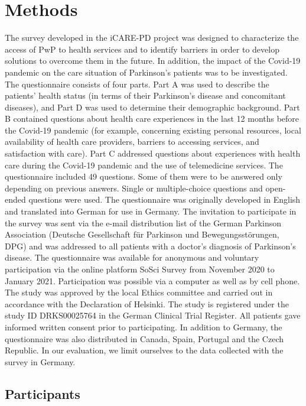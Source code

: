 \documentclass{bmcart}
\begin{document}
\section*{Methods}
The survey developed in the iCARE-PD project was designed to characterize the access of PwP to health services and to identify barriers in order to develop solutions to overcome them in the future.  In addition, the impact of the Covid-19 pandemic on the care situation of Parkinson's patients was to be investigated.
The questionnaire consists of four parts. Part A was used to describe the patients' health status (in terms of their Parkinson's disease and concomitant diseases), and Part D was used to determine their demographic background. Part B contained questions about health care experiences in the last 12 months before the Covid-19 pandemic (for example, concerning existing personal resources, local availability of health care providers, barriers to accessing services, and satisfaction with care).  Part C addressed questions about experiences with health care during the Covid-19 pandemic and the use of telemedicine services.
The questionnaire included 49 questions. Some of them were to be answered only depending on previous answers. Single or multiple-choice questions and open-ended questions were used.
The questionnaire was originally developed in English and translated into German for use in Germany. %
The invitation to participate in the survey was sent via the e-mail distribution list of the German Parkinson Association (Deutsche Gesellschaft für Parkinson und Bewegungsstörungen, DPG) and was addressed to all patients with a doctor's diagnosis of Parkinson's disease. The questionnaire was available for anonymous and voluntary participation via the online platform SoSci Survey from November 2020 to January 2021. Participation was possible via a computer as well as by cell phone.
The study was approved by the local Ethics committee and carried out in accordance with the Declaration of Helsinki. The study is registered under the study ID DRKS00025764 in the German Clinical Trial Register. All patients gave informed written consent prior to participating. %
In addition to Germany, the questionnaire was also distributed in Canada, Spain, Portugal and the Czech Republic. In our evaluation, we limit ourselves to the data collected with the survey in Germany.


\subsection*{Participants}
\end{document}
